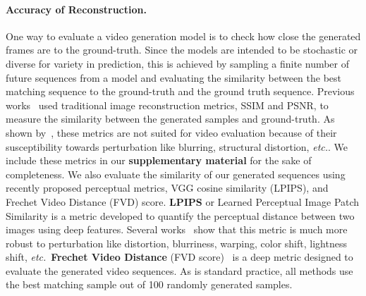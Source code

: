 \documentclass{article} \usepackage{iclr2021_conference,times}
\def\etc{\emph{etc.}}
\begin{document}
\paragraph{Accuracy of Reconstruction.}
One way to evaluate a video generation model is to check how close the generated frames are to the ground-truth. Since the models are intended to be stochastic or diverse for variety in prediction, this is achieved by sampling a finite number of future sequences from a model and evaluating the similarity between the best matching sequence to the ground-truth and the ground truth sequence. Previous works~\citep{denton2018stochastic,babaeizadeh2017stochastic,lee2018savp} used traditional image reconstruction metrics, SSIM and PSNR, to measure the similarity between the generated samples and ground-truth. As shown by~\citep{Zhang_2018,dosovitskiy2016generating,Johnson_2016,unterthiner2018accurate}, these metrics are not suited for video evaluation because of their susceptibility towards perturbation like blurring, structural distortion, \etc. We include these metrics in our \textbf{supplementary material} for the sake of completeness. We also evaluate the similarity of our generated sequences using recently proposed perceptual metrics, VGG cosine similarity (LPIPS), and Frechet Video Distance (FVD) score. \textbf{LPIPS} or Learned Perceptual Image Patch Similarity is a metric developed to quantify the perceptual distance between two images using deep features. Several works~\citep{Zhang_2018,dosovitskiy2016generating,Johnson_2016} show that this metric is much more robust to perturbation like distortion, blurriness, warping, color shift, lightness shift, \etc\ \textbf{Frechet Video Distance} (FVD score)~\citep{unterthiner2018accurate} is a deep metric designed to evaluate the generated video sequences. As is standard practice, all methods use the best matching sample out of 100 randomly generated samples. 
\end{document}
